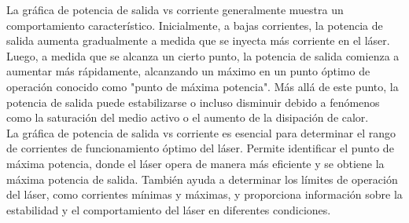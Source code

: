 \documentclass[12pt,fleqn,a4paper,oneside]{LegrandOrangeBook}
\begin{document}
La gráfica de potencia de salida vs corriente generalmente muestra un comportamiento característico. Inicialmente, a bajas corrientes, la potencia de salida aumenta gradualmente a medida que se inyecta más corriente en el láser. Luego, a medida que se alcanza un cierto punto, la potencia de salida comienza a aumentar más rápidamente, alcanzando un máximo en un punto óptimo de operación conocido como "punto de máxima potencia". Más allá de este punto, la potencia de salida puede estabilizarse o incluso disminuir debido a fenómenos como la saturación del medio activo o el aumento de la disipación de calor. \\
La gráfica de potencia de salida vs corriente es esencial para determinar el rango de corrientes de funcionamiento óptimo del láser. Permite identificar el punto de máxima potencia, donde el láser opera de manera más eficiente y se obtiene la máxima potencia de salida. También ayuda a determinar los límites de operación del láser, como corrientes mínimas y máximas, y proporciona información sobre la estabilidad y el comportamiento del láser en diferentes condiciones.
\end{document}
